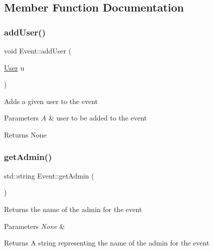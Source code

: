 \subsection{Member Function Documentation}
\mbox{\label{class_event_a6cf708e6ba961e2392716dd2c53d7938}} 
\subsubsection{\texorpdfstring{add\+User()}{addUser()}}
{\footnotesize\ttfamily void Event\+::add\+User (\begin{DoxyParamCaption}\item[{\mbox{\hyperlink{class_user}{User}}}]{u }\end{DoxyParamCaption})}

Adds a given user to the event 
\begin{DoxyParams}{Parameters}
{\em A} & user to be added to the event \\
\hline
\end{DoxyParams}
\begin{DoxyReturn}{Returns}
None 
\end{DoxyReturn}
\mbox{\label{class_event_a61903b21fd660d7ddaa126dab671a756}} 
\subsubsection{\texorpdfstring{get\+Admin()}{getAdmin()}}
{\footnotesize\ttfamily std\+::string Event\+::get\+Admin (\begin{DoxyParamCaption}{ }\end{DoxyParamCaption})}

Returns the name of the admin for the event 
\begin{DoxyParams}{Parameters}
{\em None} & \\
\hline
\end{DoxyParams}
\begin{DoxyReturn}{Returns}
A string representing the name of the admin for the event 
\end{DoxyReturn}
\mbox{\label{class_event_a099c123993ee717521ec411838d0f719}} 
